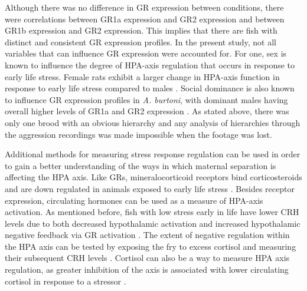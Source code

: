\documentclass[12pt,twoside]{reedthesis}
\begin{document}
Although there was no difference in GR expression between conditions, there were
correlations between GR1a expression and GR2 expression and between GR1b
expression and GR2 expression. This implies that there are fish with distinct
and consistent GR expression profiles. In the present study, not all variables that can influence GR expression were
accounted for. For one, sex is known to influence the degree of HPA-axis
regulation that occurs in response to early life stress. Female rats exhibit a
larger change in HPA-axis function in response to early life stress compared to males \citep{mccormick_sex-specific_1995}. Social dominance is also known to influence
GR expression profiles in \textit{A. burtoni}, with dominant
males having overall higher levels of GR1a and GR2 expression
\citep{korzan_social_2014}. As stated above, there was only one brood with an
obvious hierarchy and any analysis of hierarchies through the aggression
recordings was made impossible when the footage was lost.

Additional methods for measuring stress response regulation can be used in order
to gain a better understanding of the ways in which maternal separation is
affecting the HPA axis. Like GRs, mineralocorticoid receptors bind
corticosteroids and are
down regulated in animals exposed to early life stress \citep{gass_mice_2001, meaney_early_1996}.
Besides receptor expression, circulating hormones can be used
as a measure of HPA-axis activation. As mentioned
before, fish with low stress early in life have lower CRH levels due to both
decreased hypothalamic activation and increased hypothalamic negative feedback via
GR activation \citep{taborsky_stable_2012}. The extent of negative regulation
within the HPA axis can be tested by exposing the fry to excess cortisol and
measuring their subsequent CRH levels \citep{liu_maternal_2000}. Cortisol can also be a way to measure HPA
axis regulation, as greater inhibition of the axis is associated with lower
circulating cortisol in response to a stressor \citep{liu_maternal_2000}.
\end{document}
